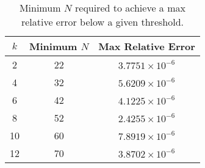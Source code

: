 \begin{table}[h]
    \centering
    \begin{tabular}{|c|c|c|}
        \hline
        $k$ & Minimum $N$ & Max Relative Error \\ 
        \hline
        2  & 22  & $3.7751 \times 10^{-6}$ \\ 
        4  & 32  & $5.6209 \times 10^{-6}$ \\ 
        6  & 42  & $4.1225 \times 10^{-6}$ \\ 
        8  & 52  & $2.4255 \times 10^{-6}$ \\ 
        10 & 60  & $7.8919 \times 10^{-6}$ \\ 
        12 & 70  & $3.8702 \times 10^{-6}$ \\ 
        \hline
    \end{tabular}
    \caption{Minimum $N$ required to achieve a max relative error below a given threshold.}
    \label{tab:fourier_accuracy}
\end{table}

